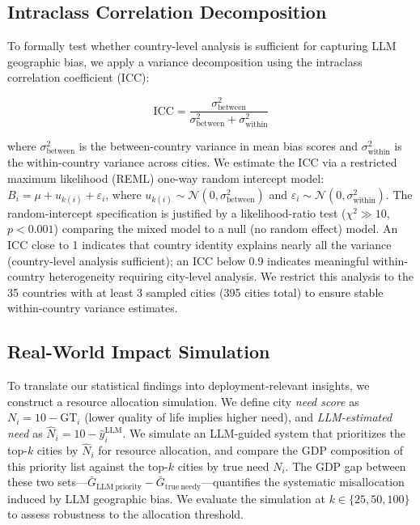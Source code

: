 \documentclass[12pt]{article}
\begin{document}
\subsection{Intraclass Correlation Decomposition}

To formally test whether country-level analysis is sufficient for capturing LLM geographic bias, we apply a variance decomposition using the intraclass correlation coefficient (ICC):

\begin{equation}
\label{eq:icc}
\mathrm{ICC} = \frac{\sigma^2_{\mathrm{between}}}{\sigma^2_{\mathrm{between}} + \sigma^2_{\mathrm{within}}}
\end{equation}

where $\sigma^2_{\mathrm{between}}$ is the between-country variance in mean bias scores and $\sigma^2_{\mathrm{within}}$ is the within-country variance across cities. We estimate the ICC via a restricted maximum likelihood (REML) one-way random intercept model: $B_i = \mu + u_{k(i)} + \varepsilon_i$, where $u_{k(i)} \sim \mathcal{N}(0, \sigma^2_{\mathrm{between}})$ and $\varepsilon_i \sim \mathcal{N}(0, \sigma^2_{\mathrm{within}})$. The random-intercept specification is justified by a likelihood-ratio test ($\chi^2 \gg 10$, $p < 0.001$) comparing the mixed model to a null (no random effect) model. An ICC close to 1 indicates that country identity explains nearly all the variance (country-level analysis sufficient); an ICC below 0.9 indicates meaningful within-country heterogeneity requiring city-level analysis. We restrict this analysis to the 35 countries with at least 3 sampled cities (395 cities total) to ensure stable within-country variance estimates.

\subsection{Real-World Impact Simulation}

To translate our statistical findings into deployment-relevant insights, we construct a resource allocation simulation. We define city \emph{need score} as $N_i = 10 - \mathrm{GT}_i$ (lower quality of life implies higher need), and \emph{LLM-estimated need} as $\hat{N}_i = 10 - \hat{y}_i^{\mathrm{LLM}}$. We simulate an LLM-guided system that prioritizes the top-$k$ cities by $\hat{N}_i$ for resource allocation, and compare the GDP composition of this priority list against the top-$k$ cities by true need $N_i$. The GDP gap between these two sets---$\bar{G}_{\mathrm{LLM\ priority}} - \bar{G}_{\mathrm{true\ needy}}$---quantifies the systematic misallocation induced by LLM geographic bias. We evaluate the simulation at $k \in \{25, 50, 100\}$ to assess robustness to the allocation threshold.
\end{document}
